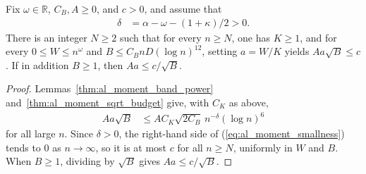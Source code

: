 \begin{lemma}
    \label{thm:al_moment_weight_smallness}
    \leanok
    Fix $\omega\in\mathbb R$, $C_B,A\ge0$, and $c>0$, and assume that
    \begin{align}
        \delta & =\alpha-\omega-(1+\kappa)/2>0.
        \label{eq:al_moment_margin}
    \end{align}
    There is an integer $N\ge2$ such that for every $n\ge N$, one has $K\ge1$,
    and for every $0\le W\le n^\omega$ and $B\le C_BnD(\log n)^{12}$,
    setting $a=W/K$ yields $Aa\sqrt B\le c$. If in addition $B\ge1$, then
    $Aa\le c/\sqrt B$.
\end{lemma}
\begin{proof}\leanok
    Lemmas~\ref{thm:al_moment_band_power}
    and~\ref{thm:al_moment_sqrt_budget} give, with $C_K$ as above,
    \begin{align}
        Aa\sqrt B
         & \le AC_K\sqrt{2C_B}\,n^{-\delta}(\log n)^6
        \label{eq:al_moment_smallness}
    \end{align}
    for all large $n$. Since $\delta>0$, the right-hand side of
    (\ref{eq:al_moment_smallness}) tends to $0$ as $n\to\infty$, so it is at
    most $c$ for all $n\ge N$, uniformly in $W$ and $B$. When $B\ge1$, dividing
    by $\sqrt B$ gives $Aa\le c/\sqrt B$.
\end{proof}

